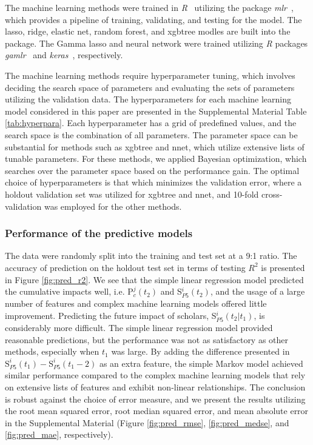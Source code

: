 The machine learning methods were trained in \textit{R}~\cite{RCT2019} utilizing the package \textit{mlr}~\cite{Bischl2016}, which provides a pipeline of training, validating, and testing for the model. The lasso, ridge, elastic net, random forest, and xgbtree modles are built into the package. The Gamma lasso and neural network were trained utilizing \textit{R} packages \textit{gamlr}~\cite{Taddy2017} and \textit{keras}~\cite{Allaire2019}, respectively. 

The machine learning methods require hyperparameter tuning, which involves deciding the search space of parameters and evaluating the sets of parameters utilizing the validation data. The hyperparameters for each machine learning model considered in this paper are presented in the Supplemental Material Table \ref{tab:hyperpara}. Each hyperparameter has a grid of predefined values, and the search space is the combination of all parameters. The parameter space can be substantial for methods such as xgbtree and nnet, which utilize extensive lists of tunable parameters. For these methods, we applied Bayesian optimization, which searches over the parameter space based on the performance gain. The optimal choice of hyperparameters is that which minimizes the validation error, where a holdout validation set was utilized for xgbtree and nnet, and 10-fold cross-validation was employed for the other methods.


\subsubsection*{Performance of the predictive models}

The data were randomly split into the training and test set at a 9:1 ratio. The accuracy of prediction on the holdout test set in terms of testing $R^2$ is presented in Figure \ref{fig:pred_r2}. We see that the simple linear regression model predicted the cumulative impacts well, i.e. P$_c^{j}(t_2)$ and S$_{P5}^{i}(t_2)$, and the usage of a large number of features and complex machine learning models offered little improvement. Predicting the future impact of scholars, S$_{P5}^{i}(t_2|t_1)$, is considerably more difficult. The simple linear regression model provided reasonable predictions, but the performance was not as satisfactory as other methods, especially when $t_1$ was large. By adding the difference presented in $\text{S}_{P5}^{i}(t_1) - \text{S}_{P5}^{i}(t_1-2)$ as an extra feature, the simple Markov model achieved similar performance compared to the complex machine learning models that rely on extensive lists of features and exhibit non-linear relationships. The conclusion is robust against the choice of error measure, and we present the results utilizing the root mean squared error, root median squared error, and mean absolute error in the Supplemental Material (Figure \ref{fig:pred_rmse}, \ref{fig:pred_medse}, and \ref{fig:pred_mae}, respectively). 

